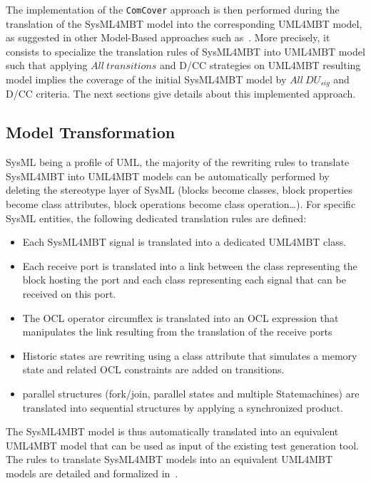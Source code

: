 \documentclass{llncs}
\begin{document}
The implementation of the \texttt{ComCover} approach is then performed
during the translation of the SysML4MBT model into the corresponding
UML4MBT model, as suggested in other Model-Based approaches such
as~\cite{weiss10}. More precisely, it consists to specialize the
translation rules of SysML4MBT into UML4MBT model such that applying
$All~transitions$ and D/CC strategies on UML4MBT resulting model
implies the coverage of the initial SysML4MBT model by $All~DU_{sig}$
and D/CC criteria. The next sections give details about
this implemented approach. 

\subsection{Model Transformation}
\vspace*{-.15cm}
SysML being a profile of UML, the majority of the rewriting rules to translate SysML4MBT
into UML4MBT models can be automatically performed by deleting the stereotype
layer of SysML (blocks become classes, block properties become class
attributes, block operations become class operation\ldots). For
specific SysML entities, the following dedicated translation rules are defined:

\begin{itemize}
  \vspace*{-0.25cm}
\item Each SysML4MBT signal is translated into a dedicated UML4MBT
    class. 
  \item Each receive port is translated into a link between the class
    representing the block hosting the port and each class
    representing each signal that can be received on this port. 
  \item The OCL operator circumflex is translated into an OCL
    expression that manipulates the link resulting from the
    translation of the receive ports
  \item Historic states are rewriting using a class attribute that
    simulates a memory state and related OCL constraints are added on
    transitions. 
  \item parallel structures (fork/join, parallel states and multiple
    Statemachines) are translated into sequential structures by
    applying a synchronized product. 
\end{itemize} 
The SysML4MBT model is thus automatically translated into an
equivalent UML4MBT model that can be used as input of the existing
test generation tool. The rules to translate SysML4MBT models into an equivalent UML4MBT models
are detailed and formalized in~\cite{UMLFM10}. 
\end{document}
